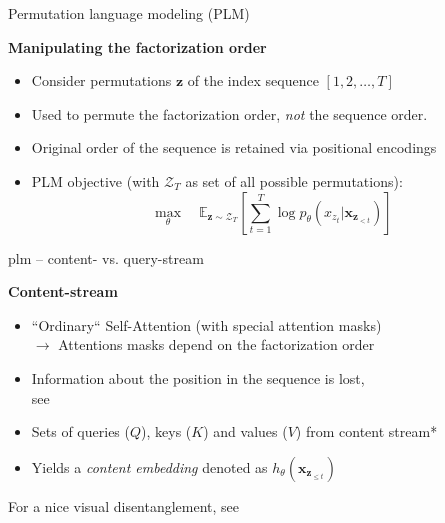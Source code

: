
\begin{frame}{Permutation language modeling (PLM)}

\vfill
	
	\textbf{Manipulating the factorization order}
	
	\begin{itemize}
		\item Consider permutations $\mathbf{z}$ of the index sequence $[1,2, \hdots, T]$
		\item[$\to$] Used to permute the factorization order, \textit{not} the sequence order.
		\item Original order of the sequence is retained via positional encodings
		\item PLM objective (with $\mathcal{Z}_T$ as set of all possible permutations):
					$$\max_{\theta} \quad \mathds{E}_{\mathbf{z}\sim\mathcal{Z}_T} \left[ \sum_{t=1}^{T} \log p_\theta (x_{z_t} | \mathbf{x}_{\mathbf{z}_{< t}}) \right]$$
	\end{itemize}
	
\vfill

\end{frame}


\begin{frame}{plm -- content- vs. query-stream}

\vfill

	\textbf{Content-stream}
	
	\begin{itemize}
		\item ``Ordinary`` Self-Attention (with special attention masks)\\
					$\rightarrow$ Attentions masks depend on the factorization order
		\item Information about the position in the sequence is lost,\\
					see 
		\item Sets of queries ($Q$), keys ($K$) and values ($V$) from content stream*
		\item Yields a \textit{content embedding} denoted as $h_{\theta}(\mathbf{x}_{\mathbf{z}_{\leq t}})$
	\end{itemize}
	
\vfill

	{\footnotesize *For a nice visual disentanglement, see }
	
\end{frame}

